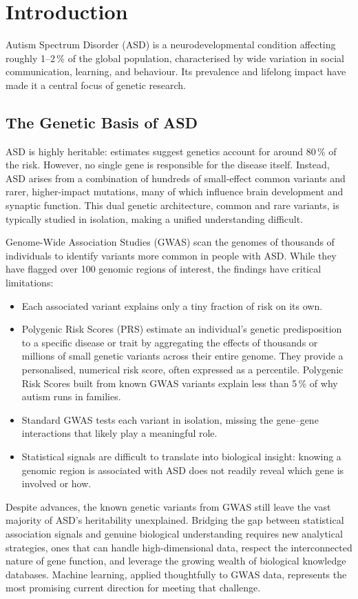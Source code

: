 \section{Introduction}
\label{sec:intro}

Autism Spectrum Disorder (ASD) is a neurodevelopmental condition affecting
roughly 1--2\,\% of the global population, characterised by wide variation
in social communication, learning, and behaviour. Its prevalence and
lifelong impact have made it a central focus of genetic research.

\subsection{The Genetic Basis of ASD}

ASD is highly heritable: estimates suggest genetics account for around
80\,\% of the risk. However, no single gene is responsible for the
disease itself. Instead, ASD arises from a combination of hundreds of
small-effect common variants and rarer, higher-impact mutations, many of
which influence brain development and synaptic function. This dual
genetic architecture, common and rare variants, is typically studied in
isolation, making a unified understanding difficult.

Genome-Wide Association Studies (GWAS) scan the genomes of thousands of
individuals to identify variants more common in people with ASD. While
they have flagged over 100 genomic regions of interest, the findings
have critical limitations:

\begin{itemize}
  \item Each associated variant explains only a tiny fraction of risk on
        its own.
  \item Polygenic Risk Scores (PRS) estimate an individual's genetic
        predisposition to a specific disease or trait by aggregating the
        effects of thousands or millions of small genetic variants
        across their entire genome. They provide a personalised,
        numerical risk score, often expressed as a percentile.
        Polygenic Risk Scores built from known GWAS variants explain
        less than 5\,\% of why autism runs in families.
  \item Standard GWAS tests each variant in isolation, missing the
        gene--gene interactions that likely play a meaningful role.
  \item Statistical signals are difficult to translate into biological
        insight: knowing a genomic region is associated with ASD does
        not readily reveal which gene is involved or how.
\end{itemize}

Despite advances, the known genetic variants from GWAS still leave the
vast majority of ASD's heritability unexplained. Bridging the gap
between statistical association signals and genuine biological
understanding requires new analytical strategies, ones that can handle
high-dimensional data, respect the interconnected nature of gene
function, and leverage the growing wealth of biological knowledge
databases. Machine learning, applied thoughtfully to GWAS data,
represents the most promising current direction for meeting that
challenge.
